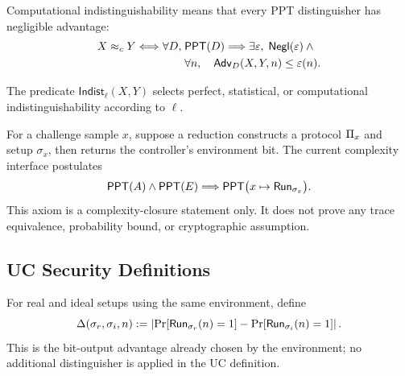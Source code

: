 \begin{definition}
\label{def:uc-computational-indist}
\leanok
Computational indistinguishability means that every PPT distinguisher has
negligible advantage:
\[
\begin{aligned}
  X\approx_cY
  \Longleftrightarrow
  \forall D,\;&\mathsf{PPT}(D)\Longrightarrow
  \exists\varepsilon,\;\mathsf{Negl}(\varepsilon)\land{}\\
  &\forall n,\quad
  \mathsf{Adv}_D(X,Y,n)\le\varepsilon(n).
\end{aligned}
\]
\end{definition}

\begin{definition}
\label{def:uc-indistinguishability}
\leanok
The predicate \(\mathsf{Indist}_\ell(X,Y)\) selects perfect, statistical, or
computational indistinguishability according to \(\ell\).
\end{definition}

\begin{definition}
\label{def:uc-controller-ppt}
\leanok
For a challenge sample \(x\), suppose a reduction constructs a protocol
\(\Pi_x\) and setup \(\sigma_x\), then returns the controller's environment
bit.  The current complexity interface postulates
\[
  \mathsf{PPT}(A)\land\mathsf{PPT}(E)
  \Longrightarrow
  \mathsf{PPT}\bigl(x\mapsto\mathsf{Run}_{\sigma_x}\bigr).
\]
This axiom is a complexity-closure statement only.  It does not prove any trace
equivalence, probability bound, or cryptographic assumption.
\end{definition}

\subsection{UC Security Definitions}

\begin{definition}
\label{def:uc-exec-diff}
\leanok
For real and ideal setups using the same environment, define
\[
  \Delta(\sigma_r,\sigma_i,n):=
  \left|
    \Pr[\mathsf{Run}_{\sigma_r}(n)=1]
    -\Pr[\mathsf{Run}_{\sigma_i}(n)=1]
  \right|.
\]
This is the bit-output advantage already chosen by the environment; no
additional distinguisher is applied in the UC definition.
\end{definition}

